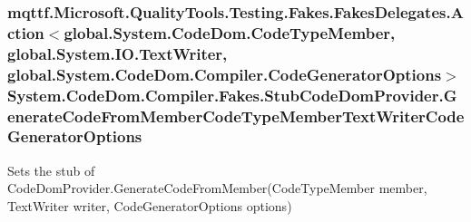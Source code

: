 \hypertarget{class_system_1_1_code_dom_1_1_compiler_1_1_fakes_1_1_stub_code_dom_provider_a6620addb9ca886f27c3db6585269c015}{
\subsubsection[{Generate\-Code\-From\-Member\-Code\-Type\-Member\-Text\-Writer\-Code\-Generator\-Options}]{\setlength{\rightskip}{0pt plus 5cm}mqttf.\-Microsoft.\-Quality\-Tools.\-Testing.\-Fakes.\-Fakes\-Delegates.\-Action$<$global.\-System.\-Code\-Dom.\-Code\-Type\-Member, global.\-System.\-I\-O.\-Text\-Writer, global.\-System.\-Code\-Dom.\-Compiler.\-Code\-Generator\-Options$>$ System.\-Code\-Dom.\-Compiler.\-Fakes.\-Stub\-Code\-Dom\-Provider.\-Generate\-Code\-From\-Member\-Code\-Type\-Member\-Text\-Writer\-Code\-Generator\-Options}}\label{class_system_1_1_code_dom_1_1_compiler_1_1_fakes_1_1_stub_code_dom_provider_a6620addb9ca886f27c3db6585269c015}


Sets the stub of Code\-Dom\-Provider.\-Generate\-Code\-From\-Member(\-Code\-Type\-Member member, Text\-Writer writer, Code\-Generator\-Options options)

